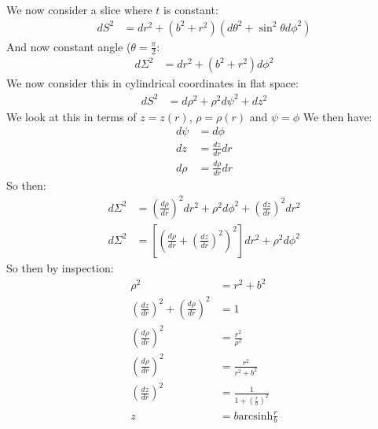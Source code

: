 We now consider a slice where $t$ is constant:
\begin{align*}
	dS^2 &= dr^2 +(b^2 + r^2)(d\theta^2 + \sin^2\theta d\phi^2)
\end{align*}
And now constant angle ($\theta = \frac{\pi}{2}$:
\begin{align*}
	d\Sigma^2 &= dr^2 +(b^2 + r^2)d\phi^2
\end{align*}
We now consider this in cylindrical coordinates in flat space:
\begin{align*}
	dS^2 &= d\rho^2 + \rho^2 d\psi^2 + dz^2
\end{align*}
We look at this in terms of $z= z(r)$, $\rho = \rho(r)$ and $\psi = \phi$
We then have:
\begin{align*}
	d\psi &= d\phi \\
	dz &= \frac{dz}{dr} dr \\
	d\rho &= \frac{d\rho}{dr} dr
\end{align*}
So then:
\begin{align*}
	d\Sigma^2 &= \left(\frac{d\rho}{dr}\right)^2 dr^2 + \rho^2d\phi^2 + \left(\frac{dz}{dr}\right)^2 dr^2 \\
	d\Sigma^2 &= \left[\left(\frac{d\rho}{dr}+ \left(\frac{dz}{dr}\right)^2 \right)^2\right] dr^2 + \rho^2d\phi^2
\end{align*}
So then by inspection:
\begin{align*}
	\rho^2 &= r^2 + b^2 \\
	\left(\frac{dz}{dr}\right)^2 + \left(\frac{d\rho}{dr}\right)^2 &= 1 \\
	\left(\frac{d\rho}{dr}\right)^2 &= \frac{r^2}{\rho^2} \\
	\left(\frac{d\rho}{dr}\right)^2 &= \frac{r^2}{r^2 + b^2} \\
	\left(\frac{dz}{dr}\right)^2 &= \frac{1}{1 + \left(\frac{r}{b}\right)^2} \\
	z &= b\text{arcsinh}\frac{r}{b}
\end{align*}
